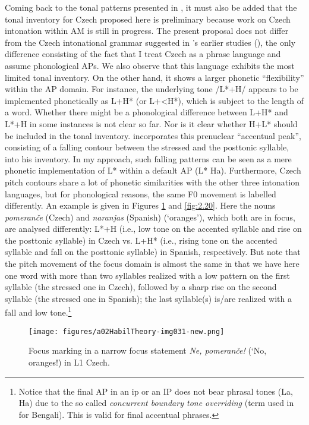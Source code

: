 Coming back to the tonal patterns presented in , it must also be added that the tonal inventory for Czech proposed here is preliminary because work on Czech intonation within AM is still in progress. The present proposal does not differ from the Czech intonational grammar suggested in \citeauthor{Duběda2011}’s earlier studies (\citeyear{Duběda2011, Duběda2014}), the only difference consisting of the fact that I treat Czech as a phrase language and assume phonological APs. We also observe that this language exhibits the most limited tonal inventory. On the other hand, it shows a larger phonetic “flexibility” within the AP domain. For instance, the underlying tone /L*+H/ appears to be implemented phonetically as L+H* (or L+<H*), which is subject to the length of a word. Whether there might be a phonological difference between L+H* and L*+H in some instances is not clear so far. Nor is it clear whether H+L* should be included in the tonal inventory. \citet[88]{Duběda2014} incorporates this prenuclear “accentual peak”, consisting of a falling contour between the stressed and the posttonic syllable, into his inventory. In my approach, such falling patterns can be seen as a mere phonetic implementation of L* within a default AP (L* Ha). Furthermore, Czech pitch contours share a lot of phonetic similarities with the other three intonation languages, but for phonological reasons, the same F0 movement is labelled differently. An example is given in Figures \ref{fig:2.19} and \ref{fig:2.20}. Here the nouns \textit{pomeranče} (Czech) and \textit{naranjas} (Spanish) (‘oranges’), which both are in focus, are analysed differently: L*+H (i.e., low tone on the accented syllable and rise on the posttonic syllable) in Czech vs. L+H* (i.e., rising tone on the accented syllable and fall on the posttonic syllable) in Spanish, respectively. But note that the pitch movement of the focus domain is almost the same in that we have here one word with more than two syllables realized with a low pattern on the first syllable (the stressed one in Czech), followed by a sharp rise on the second syllable (the stressed one in Spanish); the last syllable(s) is/are realized with a fall and low tone.\footnote{Notice that the final AP in an ip or an IP does not bear phrasal tones (La, Ha) due to the so called \textit{concurrent boundary tone overriding} (term used in \citealt{Khan2014} for Bengali). This is valid for final accentual phrases.}




\begin{figure}[p]
\texttt{[image: figures/a02HabilTheory-img031-new.png]}
\caption{Focus marking in a narrow focus statement \textit{Ne, pomeranče!} (‘No, oranges!) in L1 Czech.}
\label{fig:2.19}
\end{figure}


